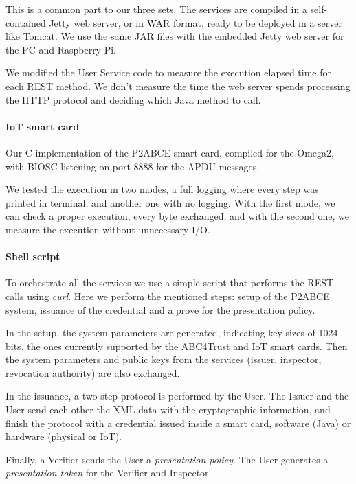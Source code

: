 This is a common part to our three sets. The services are compiled in a self-contained Jetty web server, or in WAR format, ready to be deployed in a server like Tomcat. We use the same JAR files with the embedded Jetty web server for the PC and Raspberry Pi.

We modified the User Service code to measure the execution elapsed time for each REST method. We don't measure the time the web server spends processing the HTTP protocol and deciding which Java method to call.


\paragraph{IoT smart card}\hfil

Our C implementation of the P2ABCE smart card, compiled for the Omega2, with BIOSC listening on port 8888 for the APDU messages.

We tested the execution in two modes, a full logging where every step was printed in terminal, and another one with no logging. With the first mode, we can check a proper execution, every byte exchanged, and with the second one, we measure the execution without unnecessary I/O.

\paragraph{Shell script} \hfil

To orchestrate all the services we use a simple script that performs the REST calls using  \textit{curl}. Here we perform the mentioned steps: setup of the P2ABCE system, issuance of the credential and a prove for the presentation policy.

In the setup, the system parameters are generated, indicating key sizes of 1024 bits, the ones currently supported by the ABC4Trust and IoT smart cards. Then the system parameters and public keys from the services (issuer, inspector, revocation authority) are also exchanged.

In the issuance, a two step protocol is performed by the User. The Issuer and the User send each other the XML data with the cryptographic information, and finish the protocol with a credential issued inside a smart card, software (Java) or hardware (physical or IoT).

Finally, a Verifier sends the User a \textit{presentation policy}. The User generates a \textit{presentation token} for the Verifier and Inspector.


